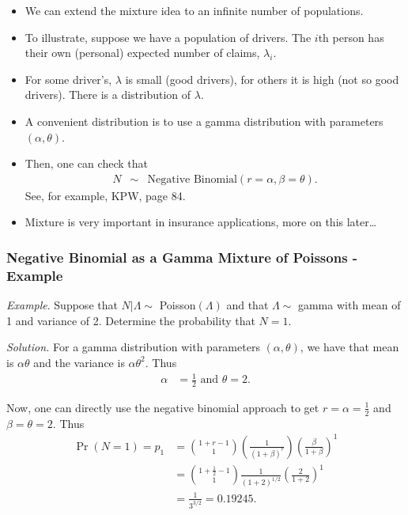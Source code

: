 \documentclass[]{book}
\begin{document}
\begin{itemize}
\item
  We can extend the mixture idea to an infinite number of populations.
\item
  To illustrate, suppose we have a population of drivers. The \(i\)th
  person has their own (personal) expected number of claims,
  \(\lambda_i\).
\item
  For some driver's, \(\lambda\) is small (good drivers), for others it
  is high (not so good drivers). There is a distribution of \(\lambda\).
\item
  A convenient distribution is to use a gamma distribution with
  parameters \((\alpha, \theta)\).
\item
  Then, one can check that \[\begin{aligned}
  N &\sim& \text{Negative Binomial} (r = \alpha, \beta = \theta) .\end{aligned}\]
  See, for example, KPW, page 84.
\item
  Mixture is very important in insurance applications, more on this
  later\ldots{}
\end{itemize}

\subsubsection{Negative Binomial as a Gamma Mixture of Poissons -
Example}\label{negative-binomial-as-a-gamma-mixture-of-poissons---example}

\emph{Example}. Suppose that \(N|\Lambda \sim\) Poisson\((\Lambda)\) and
that \(\Lambda \sim\) gamma with mean of 1 and variance of 2. Determine
the probability that \(N=1\).

\emph{Solution.} For a gamma distribution with parameters
\((\alpha, \theta)\), we have that mean is \(\alpha \theta\) and the
variance is \(\alpha \theta^2\). Thus \[\begin{aligned}
\alpha &= \frac{1}{2} \text{   and   } \theta =2.\end{aligned}\]

Now, one can directly use the negative binomial approach to get
\(r = \alpha = \frac{1}{2}\) and \(\beta= \theta =2\). Thus
\[\begin{aligned}
\Pr(N=1) = p_1  &= {1+r-1 \choose 1}(\frac{1}{(1+\beta)^r})(\frac{\beta}{1+\beta})^1 \\
&=                 {1+\frac{1}{2}-1 \choose 1}{\frac{1}{(1+2)^{1/2}}}(\frac{2}{1+2})^1\\
&=  \frac{1}{3^{3/2}} = 0.19245 .\end{aligned}\]
\end{document}
